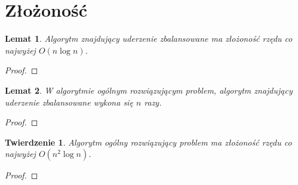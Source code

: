 \documentclass[10pt,a4paper]{article}
\newtheorem{theorem}{Twierdzenie}
\newtheorem{lemma}{Lemat}
\begin{document}
	
	\section{Złożoność}
	
	\begin{lemma}
		Algorytm znajdujący uderzenie zbalansowane ma złożoność rzędu co najwyżej $O(n \log n)$.
	\end{lemma}
	
	\begin{proof}
	\end{proof}
	
	\begin{lemma}
		W algorytmie ogólnym rozwiązującym problem, algorytm znajdujący uderzenie zbalansowane wykona się $n$ razy.
	\end{lemma}
	
	\begin{proof}
	\end{proof}	
	
	\begin{theorem}
		Algorytm ogólny rozwiązujący problem ma złożoność rzędu co najwyżej $O(n^{2} \log n)$.
	\end{theorem}
	
	\begin{proof}
	\end{proof}
	
	
\end{document}
